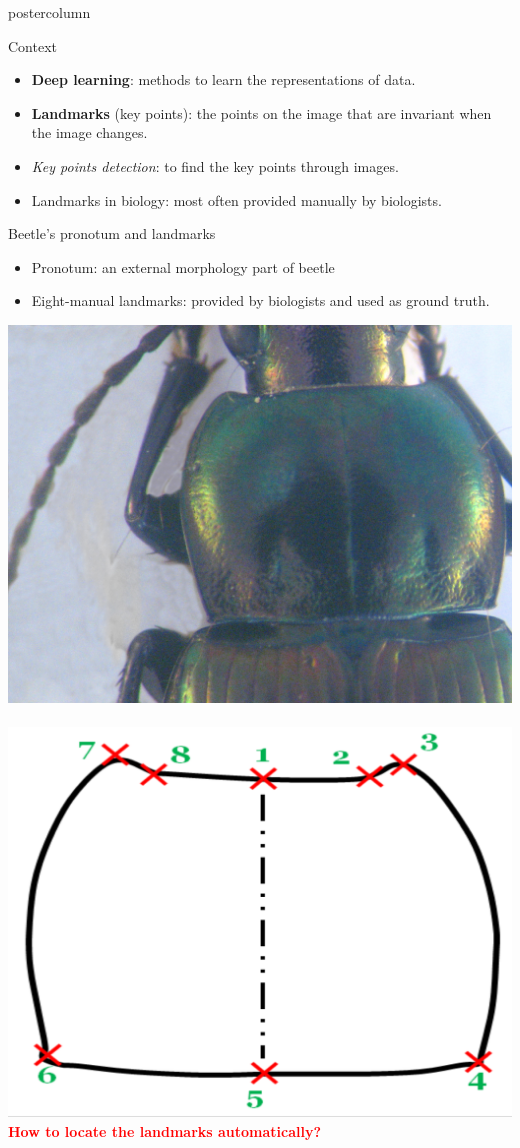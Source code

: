\begin{frame}
  \begin{columns}
    \begin{column}{.49\textwidth}
      \begin{beamercolorbox}[center,wd=\textwidth]{postercolumn}
        \begin{minipage}[T]{.95\textwidth}
          \parbox[t][\columnheight]{\textwidth}{
            \begin{block}{Context}
            	\begin{itemize}
            		\item \textbf{Deep learning}\cite{lecun2015deep}: methods to learn the representations of data.
            		\item \textbf{Landmarks} (key points): the points on the image that are invariant when the image changes.
             		\item \textit{Key points detection}: to find the key points through images.
             		\item Landmarks in biology: most often provided manually by biologists.
            	\end{itemize}
            \end{block}
            
            \vfill
            
            \begin{block}{Beetle's pronotum and landmarks}
            \begin{itemize}
            	\item Pronotum: an external morphology part of beetle
            	\item Eight-manual landmarks: provided by biologists and used as ground truth.
            \end{itemize}
            \centering
            
            \includegraphics[width=.43\textwidth]{images/pronotum.JPG}~~
            \includegraphics[width=.43\textwidth]{images/pronotum.png}            \\[0.2cm]
            \textbf{\textcolor{red}{How to locate the landmarks automatically?}}
            \end{block}
            
}
\end{minipage}
\end{beamercolorbox}
\end{column}
\end{columns}
\end{frame}
